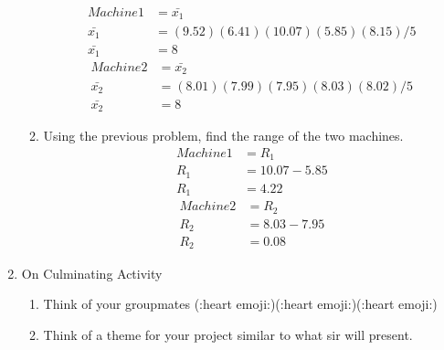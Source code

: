 \documentclass{article}
\begin{document}
\begin{enumerate}
\begin{enumerate}
                \begin{equation}
                    \begin{aligned}
                        Machine 1&=\bar{x_1} \\
                        \bar{x_1}&=(9.52)(6.41)(10.07)(5.85)(8.15)/5 \\
                        \bar{x_1}&=8 
                    \end{aligned}               
                \end{equation}
                \begin{equation}
                    \begin{aligned}
                        Machine 2&=\bar{x_2} \\
                        \bar{x_2}&=(8.01)(7.99)(7.95)(8.03)(8.02)/5 \\
                        \bar{x_2}&=8 
                    \end{aligned}                 
                \end{equation}
            \item Using the previous problem, find the range of the two machines.
                \begin{equation}
                    \begin{aligned}
                        Machine 1&=R_1 \\
                        R_1&=10.07-5.85 \\
                        R_1&=4.22
                    \end{aligned}               
                \end{equation}
                \begin{equation}
                    \begin{aligned}
                        Machine 2&=R_2 \\
                        R_2&=8.03-7.95 \\
                        R_2&=0.08
                    \end{aligned}               
                \end{equation}
        \end{enumerate}
    \item On Culminating Activity
        \begin{enumerate}
            \item Think of your groupmates (:heart emoji:)(:heart emoji:)(:heart emoji:)
            \item Think of a theme for your project similar to what sir will present.

\end{enumerate}
\end{enumerate}
\end{document}
